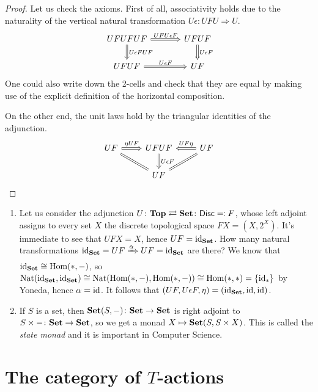 \documentclass[a4paper,11pt,oneside,openany]{scrbook}
\begin{document}
\begin{proof}
	Let us check the axioms. First of all, associativity holds due to the naturality of the vertical natural transformation $U\epsilon\colon UFU\Rightarrow U$.
	\[
		\begin{tikzcd}[column sep=3.5em]
			UFUFUF\ar[r, Rightarrow, "UFU\epsilon F"]\ar[d, Rightarrow, "U\epsilon FUF"]
			& UFUF\ar[d, Rightarrow, "U\epsilon F"] \\
			UFUF\ar[r, Rightarrow, "U\epsilon F"]
			& UF
		\end{tikzcd}
	\]
	One could also write down the 2-cells and check that they are equal by making use of the explicit definition of the horizontal composition.

	On the other end, the unit laws hold by the triangular identities of the adjunction.
	\[
		\begin{tikzcd}
			UF\ar[r, Rightarrow, "\eta UF"]\ar[dr, equal]
			& UFUF\ar[d, Rightarrow, "U\epsilon F"]
			& UF\ar[l, Rightarrow, swap, "UF\eta"]\ar[dl, Rightarrow, equal] \\
			& UF
		\end{tikzcd}
	\]
\end{proof}

\begin{exmp}
	\begin{enumerate}
		\item Let us consider the adjunction $U\colon\mathbf{Top}\rightleftarrows{\normalfont\textbf{Set}}\colon\mathsf{Disc}\eqqcolon F$, whose left adjoint assigns to every set $X$ the discrete topological space $FX=(X, 2^X)$.
		      It's immediate to see that $UFX=X$, hence $UF=\operatorname{id}_{\normalfont\textbf{Set}}$. How many natural transformations $\operatorname{id}_{\normalfont\textbf{Set}}=UF\xRightarrow{\alpha} UF=\operatorname{id}_{\normalfont\textbf{Set}}$ are there?
		      We know that $\operatorname{id}_{\normalfont\textbf{Set}}\cong\operatorname{\text{Hom}}(*,-)$, so $\text{Nat}(\operatorname{id}_{\normalfont\textbf{Set}},
			      \operatorname{id}_{\normalfont\textbf{Set}})\cong\text{Nat}(\operatorname{\text{Hom}}(*,-),\operatorname{\text{Hom}}(*,-))\cong\operatorname{\text{Hom}}(*,*)=\{\operatorname{id}_*\}$ by
		      Yoneda, hence $\alpha=\operatorname{id}$. It follows that $(UF,U\epsilon F,
			      \eta)=(\operatorname{id}_{\normalfont\textbf{Set}}, \operatorname{id}, \operatorname{id})$.
		\item If $S$ is a set, then ${\normalfont\textbf{Set}}(S,-)\colon{\normalfont\textbf{Set}}\to{\normalfont\textbf{Set}}$ is right adjoint to $S\times-\colon{\normalfont\textbf{Set}}\to{\normalfont\textbf{Set}}$, so we get a monad $X\mapsto{\normalfont\textbf{Set}}(S,S\times X)$. This is called the \emph{state monad} and it is important in Computer Science.
	\end{enumerate}
\end{exmp}


\section{The category of $T$-actions}
\end{document}
